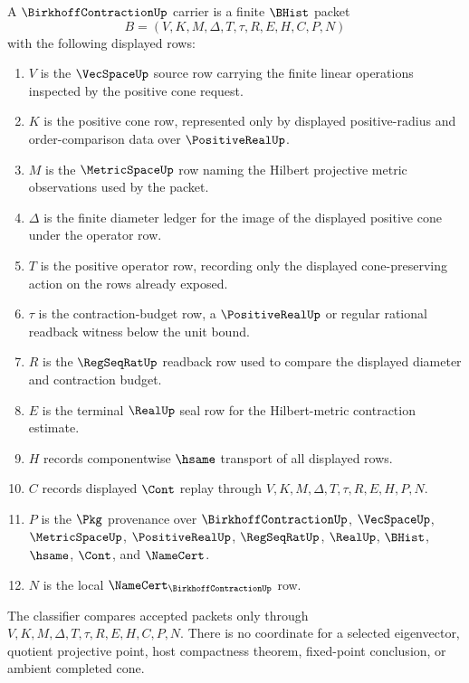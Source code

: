 \begin{definition}
\label{def:birkhoff-contraction-carrier}
A $\BirkhoffContractionUp$ carrier is a finite $\BHist$ packet
$$
B=(V,K,M,\Delta,T,\tau,R,E,H,C,P,N)
$$
with the following displayed rows:
\begin{enumerate}
\item $V$ is the $\VecSpaceUp$ source row carrying the finite linear operations inspected by the positive cone request.
\item $K$ is the positive cone row, represented only by displayed positive-radius and order-comparison data over $\PositiveRealUp$.
\item $M$ is the $\MetricSpaceUp$ row naming the Hilbert projective metric observations used by the packet.
\item $\Delta$ is the finite diameter ledger for the image of the displayed positive cone under the operator row.
\item $T$ is the positive operator row, recording only the displayed cone-preserving action on the rows already exposed.
\item $\tau$ is the contraction-budget row, a $\PositiveRealUp$ or regular rational readback witness below the unit bound.
\item $R$ is the $\RegSeqRatUp$ readback row used to compare the displayed diameter and contraction budget.
\item $E$ is the terminal $\RealUp$ seal row for the Hilbert-metric contraction estimate.
\item $H$ records componentwise $\hsame$ transport of all displayed rows.
\item $C$ records displayed $\Cont$ replay through $V,K,M,\Delta,T,\tau,R,E,H,P,N$.
\item $P$ is the $\Pkg$ provenance over $\BirkhoffContractionUp$, $\VecSpaceUp$, $\MetricSpaceUp$, $\PositiveRealUp$, $\RegSeqRatUp$, $\RealUp$, $\BHist$, $\hsame$, $\Cont$, and $\NameCert$.
\item $N$ is the local $\NameCert_{\BirkhoffContractionUp}$ row.
\end{enumerate}
The classifier compares accepted packets only through $V,K,M,\Delta,T,\tau,R,E,H,C,P,N$. There is no coordinate for a selected eigenvector, quotient projective point, host compactness theorem, fixed-point conclusion, or ambient completed cone.
\end{definition}

